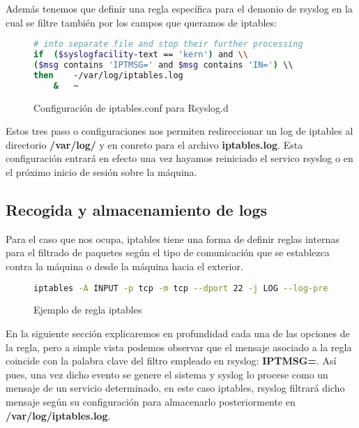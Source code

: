 Además tenemos que definir una regla específica para el demonio de rsyslog en la cual se filtre también por los campos que queramos de iptables:

\begin{figure}[H]
\begin{lstlisting}[language=bash]
# into separate file and stop their further processing
if  ($syslogfacility-text == 'kern') and \\
($msg contains 'IPTMSG=' and $msg contains 'IN=') \\
then    -/var/log/iptables.log
    &   ~

\end{lstlisting}
\caption{Configuración de iptables.conf para Rsyslog.d}
\end{figure}

Estos tres paso o configuraciones nos permiten redireccionar un log de iptables al directorio \textbf{/var/log/} y en conreto para el archivo \textbf{iptables.log}. Esta configuración entrará en efecto una vez hayamos reiniciado el servico rsyslog o en el próximo inicio de sesión sobre la máquina.

\pagebreak
\subsection[Logs]{Recogida y almacenamiento de logs}
Para el caso que nos ocupa, iptables tiene una forma de definir reglas internas para el filtrado de paquetes según el tipo de comunicación que se establezca contra la máquina o desde la máquina hacia el exterior.

\begin{figure}[H]
\begin{lstlisting}[language=bash]
iptables -A INPUT -p tcp -m tcp --dport 22 -j LOG --log-prefix "IPTMSG=Connection SSH "
\end{lstlisting}
\caption{Ejemplo de regla iptables}
\end{figure}

En la siguiente sección explicaremos en profundidad cada una de las opciones de la regla, pero a simple vista podemos observar que el mensaje asociado a la regla coincide con la palabra clave del filtro empleado en rsyslog: \textbf{IPTMSG=}. Así pues, una vez dicho evento se genere el sistema y syslog lo procese como un mensaje de un servicio determinado, en este caso iptables, rsyslog filtrará dicho mensaje según su configuración para almacenarlo posteriormente en \textbf{/var/log/iptables.log}.

